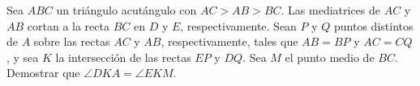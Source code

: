 Sea $ABC$ un triángulo acutángulo con $AC > AB > BC$. Las mediatrices de $AC$ y $AB$ cortan a la recta $BC$ en $D$ y $E$, respectivamente. Sean $P$ y $Q$ puntos distintos de $A$ sobre las rectas $AC$ y $AB$, respectivamente, tales que $AB = BP$ y $AC = CQ$, y sea $K$ la intersección de las rectas $EP$ y $DQ$. Sea $M$ el punto medio de $BC$. Demostrar que $\angle DKA = \angle EKM$.

